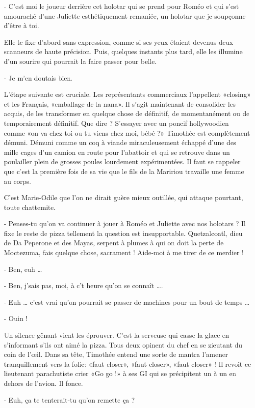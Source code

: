 - C’est moi le joueur derrière cet holotar qui se prend pour Roméo et qui s’est amouraché d’une Juliette esthétiquement remaniée, un holotar que je soupçonne d’être à toi.

Elle le fixe d’abord sans expression, comme si ses yeux étaient devenus deux scanneurs de haute précision. Puis, quelques instants plus tard, elle les illumine d’un sourire qui pourrait la faire passer pour belle.

- Je m’en doutais bien.

L’étape suivante est cruciale. Les représentants commerciaux l’appellent «closing» et les Français, «emballage de la nana». Il s’agit maintenant de consolider les acquis, de les transformer en quelque chose de définitif, de momentanément ou de temporairement définitif. Que dire ? S’essayer avec un poncif hollywoodien comme «on va chez toi ou tu viens chez moi, bébé ?» Timothée est complètement démuni. Démuni comme un coq à viande miraculeusement échappé d’une des mille cages d’un camion en route pour l’abattoir et qui se retrouve dans un poulailler plein de grosses poules lourdement expérimentées. Il faut se rappeler que c’est la première fois de sa vie que le fils de la Maririou travaille une femme au corps.

C’est Marie-Odile que l’on ne dirait guère mieux outillée, qui attaque pourtant, toute chattemite.

- Penses-tu qu’on va continuer à jouer à Roméo et Juliette avec nos holotars ?
Il fixe le reste de pizza tellement la question est insupportable. Quetzalcoatl, dieu de Da Peperone et des Mayas, serpent à plumes à qui on doit la perte de Moctezuma, fais quelque chose, sacrament ! Aide-moi à me tirer de ce merdier !

- Ben, euh …

- Ben, j’sais pas, moi, à c’t heure qu’on se connaît ….

- Euh … c’est vrai qu’on pourrait se passer de machines pour un bout de temps …

- Ouin !

Un silence gênant vient les éprouver. C’est la serveuse qui casse la glace en s’informant s’ils ont aimé la pizza. Tous deux opinent du chef en se zieutant du coin de l’œil. Dans sa tête, Timothée entend une sorte de mantra l’amener tranquillement vers la folie: «faut closer», «faut closer», «faut closer» ! Il revoit ce lieutenant parachutiste crier «Go go !» à ses GI qui se précipitent un à un en dehors de l’avion. Il fonce.

- Euh, ça te tenterait-tu qu’on remette ça ?

